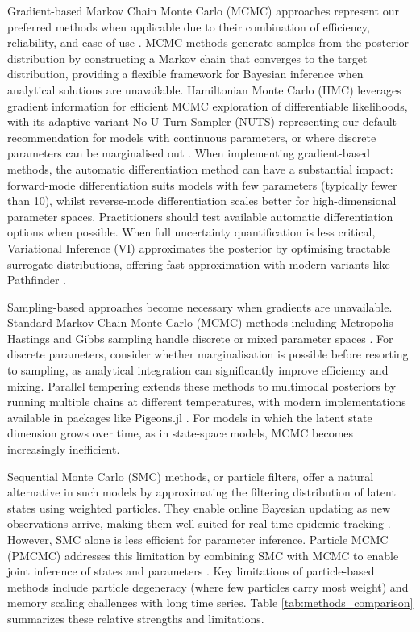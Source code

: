 \documentclass{article}
\begin{document}
Gradient-based Markov Chain Monte Carlo (MCMC) approaches represent our preferred methods when applicable due to their combination of efficiency, reliability, and ease of use \citep{gilks1995markov, lekone2006statistical}.
MCMC methods generate samples from the posterior distribution by constructing a Markov chain that converges to the target distribution, providing a flexible framework for Bayesian inference when analytical solutions are unavailable.
Hamiltonian Monte Carlo (HMC) leverages gradient information for efficient MCMC exploration of differentiable likelihoods, with its adaptive variant No-U-Turn Sampler (NUTS) representing our default recommendation for models with continuous parameters, or where discrete parameters can be marginalised out \citep{duane1987hybrid, hoffman2014no, andrade2020evaluation}.
When implementing gradient-based methods, the automatic differentiation method can have a substantial impact: forward-mode differentiation suits models with few parameters (typically fewer than 10), whilst reverse-mode differentiation scales better for high-dimensional parameter spaces.
Practitioners should test available automatic differentiation options when possible.
When full uncertainty quantification is less critical, Variational Inference (VI) approximates the posterior by optimising tractable surrogate distributions, offering fast approximation with modern variants like Pathfinder \citep{blei2017variational, chatzilena2019contemporary}.

Sampling-based approaches become necessary when gradients are unavailable.
Standard Markov Chain Monte Carlo (MCMC) methods including Metropolis-Hastings and Gibbs sampling handle discrete or mixed parameter spaces \citep{hastings1970monte, geman1984stochastic, gilks1995markov}.
For discrete parameters, consider whether marginalisation is possible before resorting to sampling, as analytical integration can significantly improve efficiency and mixing.
Parallel tempering extends these methods to multimodal posteriors by running multiple chains at different temperatures, with modern implementations available in packages like Pigeons.jl \citep{surjanovic2023pigeons}.
For models in which the latent state dimension grows over time, as in state-space models, MCMC becomes increasingly inefficient.

Sequential Monte Carlo (SMC) methods, or particle filters, offer a natural alternative in such models by approximating the filtering distribution of latent states using weighted particles. They enable online Bayesian updating as new observations arrive, making them well-suited for real-time epidemic tracking \citep{doucet2001introduction, birrell2020efficient, storvik2023sequential}. However, SMC alone is less efficient for parameter inference. Particle MCMC (PMCMC) addresses this limitation by combining SMC with MCMC to enable joint inference of states and parameters \citep{andrieu2010particle, endo2019introduction}. Key limitations of particle-based methods include particle degeneracy (where few particles carry most weight) and  memory scaling challenges with long time series. Table \ref{tab:methods_comparison} summarizes these relative strengths and limitations.
 
\end{document}
